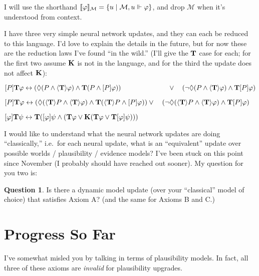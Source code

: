 \documentclass[letterpaper]{article}
\theoremstyle{definition}
\newtheorem*{question}{Question}
\newcommand{\semantics}[1]{[\![\mbox{\em $ #1 $\/}]\!]}
\newcommand{\Model}{\mathcal{M}}
\newcommand{\set}[1]{\{ #1 \}}
\newcommand{\Typ}[1]{\textrm{\textup{\textbf{T}}} #1}
\newcommand{\Know}[1]{\textrm{\textup{\textbf{K}}} #1}
\newcommand{\KnowNoArgs}{\textrm{\textup{\textbf{K}}}}
\newcommand{\Hebbop}[1]{[#1]}
\newcommand{\Update}[1]{[#1]}
\newcommand{\diaTyp}[1]{\langle \textrm{\textup{\textbf{T}}} \rangle #1}
\begin{document}
I will use the shorthand $\semantics{\varphi}_\Model =   \set{u \mid \Model, u \Vdash \varphi}$, and drop $\Model$ when it's understood from context.

I have three very simple neural network updates, and they can each be reduced to this language.  I'd love to explain the details in the future, but for now these are the reduction laws I've found ``in the wild.'' (I'll give the $\Typ$ case for each; for the first two assume $\KnowNoArgs$ is not in the language, and for the third the update does not affect $\KnowNoArgs$):
\begin{description}[leftmargin=1.25in]
    \item[Axiom A.] $\Update{P} \Typ{\varphi} \leftrightarrow 
    (\Diamond(P \land \diaTyp{\varphi}) \land \Typ{(P \land \Update{P} \varphi)}) \\
    \quad\quad\quad\quad\quad\quad\quad \lor \quad (\neg \Diamond(P \land \diaTyp{\varphi}) \land \Typ{\Update{P} \varphi})$
    \item[Axiom B.] $\Update{P} \Typ{\varphi} \leftrightarrow 
    (\Diamond(\diaTyp{P} \land \diaTyp{\varphi}) \land \Typ{(\diaTyp{P} \land \Update{P} \varphi)}) \\
    \lor \quad (\neg \Diamond(\diaTyp{P} \land \diaTyp{\varphi}) \land \Typ{\Update{P} \varphi})$
    \item[Axiom C.] $\Hebbop{\varphi} \Typ{\psi} \leftrightarrow 
    \Typ{(\Hebbop{\varphi}\psi \land (\Typ{\varphi \lor \Know{(\Typ{\varphi} \lor \Typ{\Hebbop{\varphi}\psi})}}))}$
\end{description}


I would like to understand what the neural network updates are doing ``classically,'' i.e.\ for each neural update, what is an ``equivalent'' update over possible worlds / plausibility / evidence models?  I've been stuck on this point since November (I probably should have reached out sooner).  My question for you two is:
\begin{question}
    Is there a dynamic model update (over your ``classical'' model of choice) that satisfies Axiom A? (and the same for Axioms B and C.)
\end{question}

\section*{Progress So Far}

I've somewhat misled you by talking in terms of plausibility models.  In fact, all three of these axioms are \emph{invalid} for plausibility upgrades.
\end{document}

